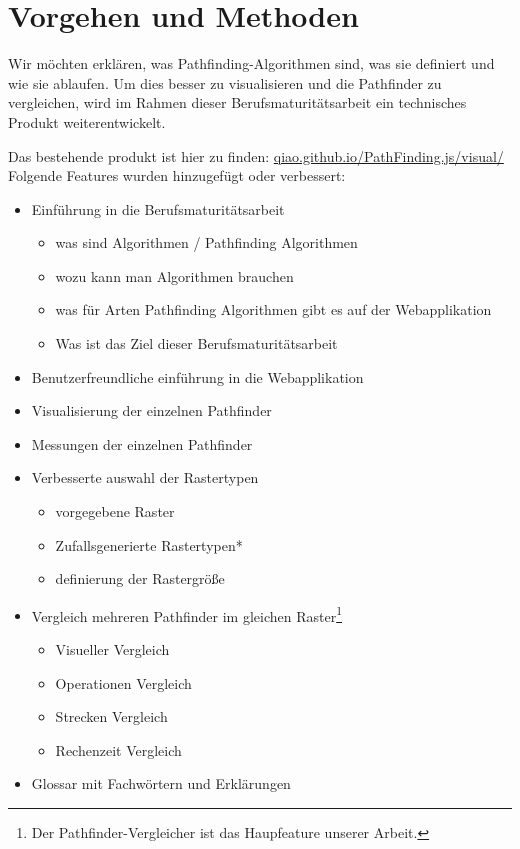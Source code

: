 \section{Vorgehen und Methoden}

Wir möchten erklären, was Pathfinding-Algorithmen sind, was sie definiert
und wie sie ablaufen. Um dies besser zu visualisieren und die Pathfinder
zu vergleichen, wird im Rahmen dieser Berufsmaturitätsarbeit ein
technisches Produkt weiterentwickelt.

Das bestehende produkt ist hier zu finden:
\url{qiao.github.io/PathFinding.js/visual/}\\

Folgende Features wurden hinzugefügt oder verbessert:
\begin{itemize}
\item
  Einführung in die Berufsmaturitätsarbeit

  \begin{itemize}
  \item
    was sind Algorithmen / Pathfinding Algorithmen
  \item
    wozu kann man Algorithmen brauchen
  \item
    was für Arten Pathfinding Algorithmen gibt es auf der Webapplikation
  \item
    Was ist das Ziel dieser Berufsmaturitätsarbeit
  \end{itemize}
\end{itemize}
\begin{itemize}
\item
  Benutzerfreundliche einführung in die Webapplikation
\item
  Visualisierung der einzelnen Pathfinder
\item
  Messungen der einzelnen Pathfinder
\item
  Verbesserte auswahl der Rastertypen

  \begin{itemize}
  \item
    vorgegebene Raster
  \item
    Zufallsgenerierte Rastertypen*
  \item
    definierung der Rastergröße
  \end{itemize}
\item
  Vergleich mehreren Pathfinder im gleichen Raster\footnote{Der Pathfinder-Vergleicher ist das Haupfeature unserer Arbeit.}
  \begin{itemize}
  \item
    Visueller Vergleich
  \item
    Operationen Vergleich
  \item
    Strecken Vergleich
  \item
    Rechenzeit Vergleich
  \end{itemize}
\end{itemize}
\begin{itemize}
\item
  Glossar mit Fachwörtern und Erklärungen
\end{itemize}


